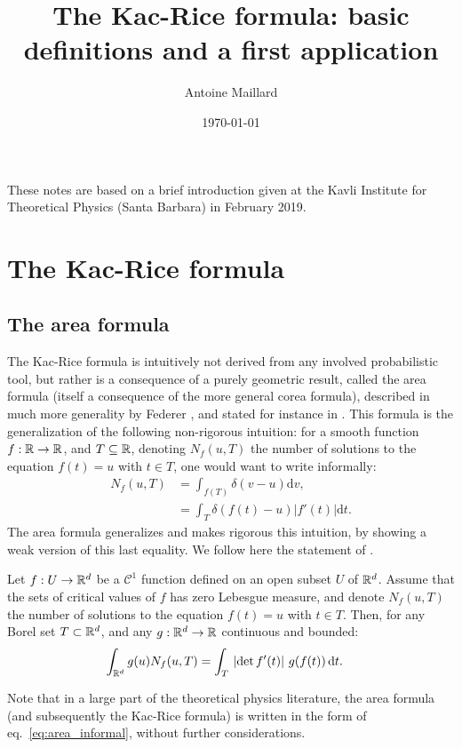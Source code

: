 \documentclass[amsmath,amssymb,nofootinbib,prd]{article}
\begin{document}
\title{The Kac-Rice formula: basic definitions and a first application}
\date{\today}
\author{Antoine Maillard}
\maketitle
%
\renewcommand{\labelitemi}{$\bullet$}

These notes are based on a brief introduction given at the Kavli Institute for Theoretical Physics (Santa Barbara) in February 2019.

\section{The Kac-Rice formula}

\subsection{The area formula}
	The Kac-Rice formula is intuitively not derived from any involved probabilistic tool, but rather is a consequence of a purely geometric result, called the area formula (itself a consequence of the more general corea formula), described in much more generality by Federer \cite{federer1959curvature}, and stated for instance in \cite{azais2009level}. 
	This formula is the generalization of the following non-rigorous intuition: for a smooth function $f : \mathbb{R} \to \mathbb{R}$, and $T \subseteq \mathbb{R}$,
	 denoting $N_f(u,T)$ the number of solutions to the equation $f(t) = u$ with $t \in T$, one would want to write informally:
	\begin{align}
	N_f(u,T) &= \int_{f(T)} \delta\left(v - u\right) \mathrm{d}v, \\
	\label{eq:area_informal}
	  &= \int_T \delta\left(f(t) - u\right) |f'(t)| \mathrm{d}t.
	\end{align}
	The area formula generalizes and makes rigorous this intuition, by showing a weak version of this last equality. We follow here the statement of \cite{azais2009level}. 
	\begin{proposition}\label{prop:area}
	Let $f : U \to \mathbb{R}^d$ be a $\mathcal{C}^1$ function defined on an open subset $U$ of $\mathbb{R}^d$. Assume that the sets of critical values of $f$ has zero Lebesgue measure, and denote $N_f(u,T)$  the number of solutions to the equation $f(t) = u$ with $t \in T$. Then, for any Borel set $T \subset \mathbb{R}^d$, and any $g : \mathbb{R}^d \to \mathbb{R}$ continuous and bounded:
	\begin{align}
\int_{\mathbb{R}^d} g(u) N_f(u,T) &= \int_T \, \left|\det f'(t)\right| \, g(f(t)) \,\mathrm{d}t. 	
	\end{align}
	\end{proposition}
	Note that in a large part of the theoretical physics literature, the area formula (and subsequently the Kac-Rice formula) is written in the form of eq.~\eqref{eq:area_informal}, 
	without further considerations.
	
\end{document}
